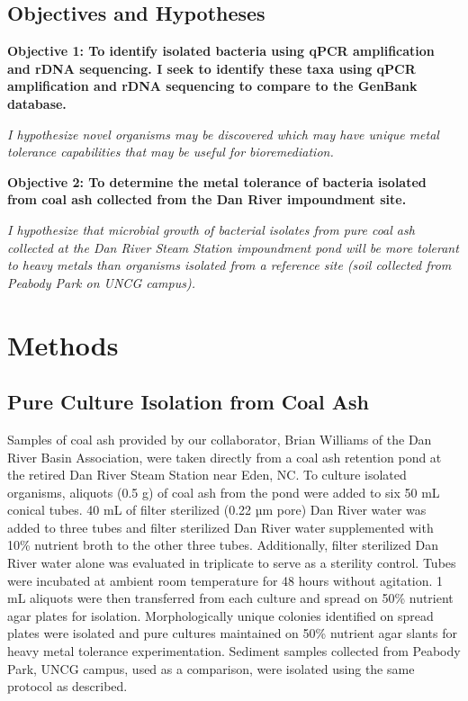 \documentclass[ms, hidelinks]{uncgdissertationexp}
\theoremstyle{plain}
\theoremstyle{definition}
\theoremstyle{remark}
\begin{document}
\hypertarget{objectives-and-hypotheses}{%
\subsection{Objectives and Hypotheses}\label{objectives-and-hypotheses}}

\textbf{Objective 1: To identify isolated bacteria using qPCR amplification and rDNA sequencing. I seek to identify these taxa using qPCR amplification and rDNA sequencing to compare to the GenBank database.}

\emph{I hypothesize novel organisms may be discovered which may have unique metal tolerance capabilities that may be useful for bioremediation.}

\textbf{Objective 2: To determine the metal tolerance of bacteria isolated from coal ash collected from the Dan River impoundment site.}

\emph{I hypothesize that microbial growth of bacterial isolates from pure coal ash collected at the Dan River Steam Station impoundment pond will be more tolerant to heavy metals than organisms isolated from a reference site (soil collected from Peabody Park on UNCG campus).}

\hypertarget{methods-1}{%
\section{Methods}\label{methods-1}}

\hypertarget{pure-culture-isolation-from-coal-ash}{%
\subsection{Pure Culture Isolation from Coal Ash}\label{pure-culture-isolation-from-coal-ash}}

Samples of coal ash provided by our collaborator, Brian Williams of the Dan River Basin Association, were taken directly from a coal ash retention pond at the retired Dan River Steam Station near Eden, NC. To culture isolated organisms, aliquots (0.5 g) of coal ash from the pond were added to six 50 mL conical tubes. 40 mL of filter sterilized (0.22 µm pore) Dan River water was added to three tubes and filter sterilized Dan River water supplemented with 10\% nutrient broth to the other three tubes. Additionally, filter sterilized Dan River water alone was evaluated in triplicate to serve as a sterility control. Tubes were incubated at ambient room temperature for 48 hours without agitation. 1 mL aliquots were then transferred from each culture and spread on 50\% nutrient agar plates for isolation. Morphologically unique colonies identified on spread plates were isolated and pure cultures maintained on 50\% nutrient agar slants for heavy metal tolerance experimentation. Sediment samples collected from Peabody Park, UNCG campus, used as a comparison, were isolated using the same protocol as described.
\end{document}
